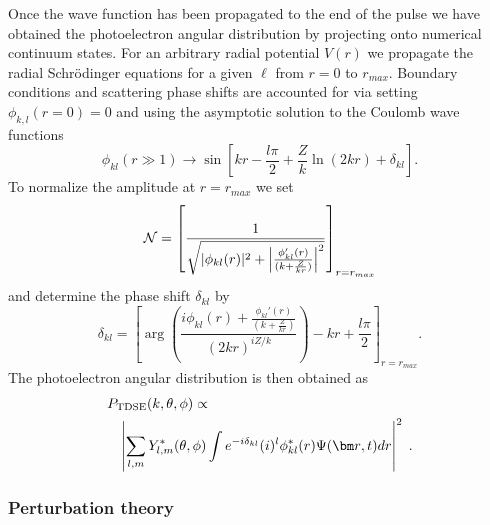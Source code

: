 Once the wave function has been propagated to the end of the pulse we have obtained the photoelectron angular distribution  by projecting onto numerical continuum states. For an arbitrary radial potential $V(r)$ we propagate the radial Schr\"odinger equations for a given $\ell$ from $r=0$ to $r_{max}$. Boundary conditions and scattering phase shifts are accounted for via setting $\phi_{k,l}(r=0)=0$ and using the asymptotic solution to the Coulomb wave functions
%
\begin{equation}
	\phi_{kl}(r\gg1) \rightarrow \sin\left[kr - \frac{l\pi}{2} +\frac{Z}{k} \ln(2kr) + \delta_{kl} \right].
\end{equation}
%
To normalize the amplitude at $r = r_{max}$ we set
%
\begin{equation}
	{\cal N} = \left[\frac{1}{\sqrt{|\phi_{kl}(r)|^2 + \left|\frac{\phi_{kl}'(r)}{(k+\frac{Z}{kr})}\right|^2}} \right]_{r=r_{max}}
\end{equation}
%
and determine the phase shift $\delta_{kl}$ by
%
\begin{equation}
    \delta_{kl} = \left[\arg\left(\frac{i\phi_{kl}(r) + \frac{\phi_{kl}'(r)}{(k+\frac{Z}{kr})} }{(2kr)^{iZ/k}}\right) - kr + \frac{l\pi}{2} \right]_{r=r_{max}}.
\end{equation}
%
The photoelectron angular distribution is then obtained as
%
\begin{eqnarray}
\lefteqn{P_{\text{TDSE}}(k,\theta,\phi) \propto}
    \\
    &&
    \left|\sum_{l,m} Y^*_{l,m}(\theta,\phi)\int  e^{-i\delta_{kl}}(i)^l \phi_{kl}^*(r) \Psi({\bm r},t) dr \right|^2 \; .
    \nonumber
\end{eqnarray}

\subsubsection{Perturbation theory}

